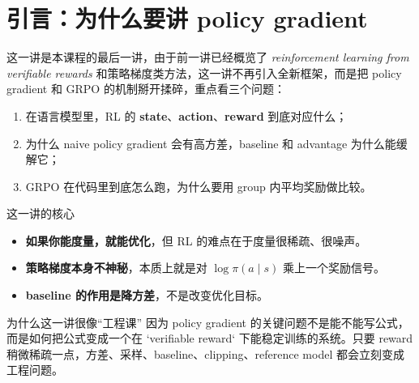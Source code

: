 \section{引言：为什么要讲 policy gradient}

这一讲是本课程的最后一讲，由于前一讲已经概览了 \emph{reinforcement learning from verifiable rewards} 和策略梯度类方法，这一讲不再引入全新框架，而是把 policy gradient 和 GRPO 的机制掰开揉碎，重点看三个问题：
\begin{enumerate}
    \item 在语言模型里，RL 的 \textbf{state}、\textbf{action}、\textbf{reward} 到底对应什么；
    \item 为什么 naive policy gradient 会有高方差，baseline 和 advantage 为什么能缓解它；
    \item GRPO 在代码里到底怎么跑，为什么要用 group 内平均奖励做比较。
\end{enumerate}

\begin{importantbox}{这一讲的核心}
\begin{itemize}
    \item \textbf{如果你能度量，就能优化}，但 RL 的难点在于度量很稀疏、很噪声。
    \item \textbf{策略梯度本身不神秘}，本质上就是对 $\log \pi(a \mid s)$ 乘上一个奖励信号。
    \item \textbf{baseline 的作用是降方差}，不是改变优化目标。
\end{itemize}
\end{importantbox}


\begin{knowledgebox}{为什么这一讲很像“工程课”}
因为 policy gradient 的关键问题不是能不能写公式，而是如何把公式变成一个在 `verifiable reward` 下能稳定训练的系统。只要 reward 稍微稀疏一点，方差、采样、baseline、clipping、reference model 都会立刻变成工程问题。
\end{knowledgebox}

